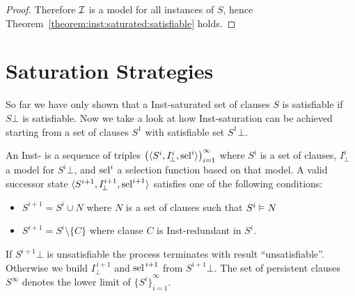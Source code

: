 \begin{proof}
        Therefore \( \mathcal{I} \) is a model for all instances of \( S \),
        hence
        Theorem~\vref{theorem:inst:saturated:satisfiable} holds.
   \end{proof}


   \section{Saturation Strategies}\label{sec:saturation:strategies}

   So far we have only shown that a Inst-saturated set of clauses
   \( S \) is satisfiable if \( S\bot \) is satisfiable.
   Now we take a look at how Inst-saturation can be achieved
   starting from a set of clauses \( S^1 \) with satisfiable set \( S^1\!\bot \).

   \begin{definition}
    An Inst- is a sequence of triples
    \(
        {\left(
            \langle
            S^i, I^{i}_{\!\bot}, \operatorname{sel}^i
            \rangle
            \right)}_{i=1}^\infty
    \)
    where \( S^i \) is a set of clauses,
    \( I^{i}_{\!\bot} \) a model for \( S^i\bot \),
    and \( \operatorname{sel}^i \) a selection function based on that model.
%
    A valid successor state 
    \( { \langle S^{i+1}, I^{i+1}_{\!\bot}, \operatorname{sel}^{i+1} \rangle } \)
    satisfies one of the following conditions:
    \begin{itemize}
        \item
        \( S^{i+1} = S^i \cup N \)
        where \( N \) is a set of clauses such that
        \( S^i \vDash N \)
        \item
        \( S^{i+1} = S^i \setminus \{ C \} \)
        where clause \( C \) is Inst-redundant in \( S^{i} \).
    \end{itemize}
\noindent If \( S^{i+1}\! \bot \) is unsatisfiable
the process terminates with result “unsatisfiable”.
Otherwise we build \( I^{\,i+1}_{\!\bot} \) and \( \operatorname{sel}^{\,i+1} \)
from \( S^{i+1}\!\bot \).
%
The set of persistent clauses \( S^\infty \) denotes the lower limit of \( {\{ S^i \}}_{i=1}^\infty \).
\end{definition}

